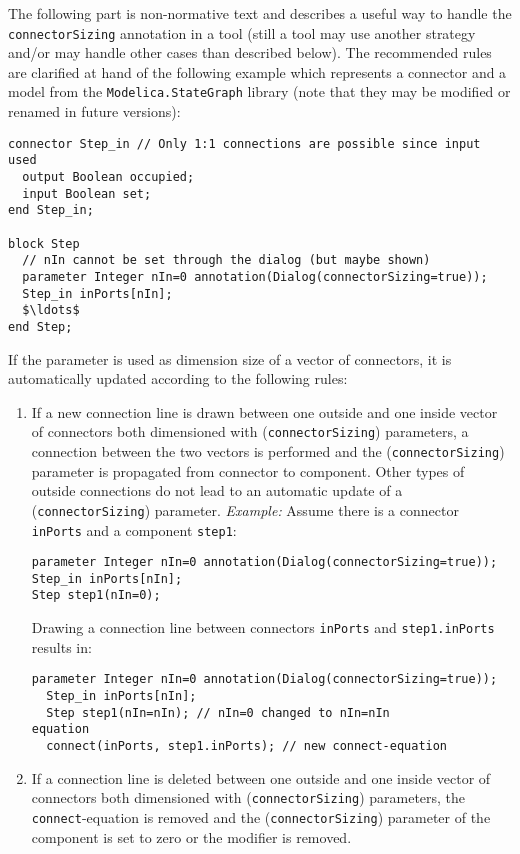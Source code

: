 \begin{nonnormative}
The following part is non-normative text and describes a useful
way to handle the \lstinline!connectorSizing! annotation in a tool (still a tool may
use another strategy and/or may handle other cases than described
below).
The recommended rules are clarified at hand of the following
example which represents a connector and a model from the
\lstinline!Modelica.StateGraph! library (note that they may be modified or renamed in future versions):
\begin{lstlisting}[language=modelica]
connector Step_in // Only 1:1 connections are possible since input used
  output Boolean occupied;
  input Boolean set;
end Step_in;

block Step
  // nIn cannot be set through the dialog (but maybe shown)
  parameter Integer nIn=0 annotation(Dialog(connectorSizing=true));
  Step_in inPorts[nIn];
  $\ldots$
end Step;
\end{lstlisting}
If the parameter is used as dimension size of a vector of
connectors, it is automatically updated according to the following
rules:
\begin{enumerate}
\item \label{connectorSizing:addVector}
  If a new connection line is drawn between one outside and one
  inside vector of connectors both dimensioned with (\lstinline!connectorSizing!)
  parameters, a connection between the two vectors is performed and the
  (\lstinline!connectorSizing!) parameter is propagated from connector to component.
  Other types of outside connections do not lead to an automatic update
  of a (\lstinline!connectorSizing!) parameter. \emph{Example:} Assume there is a
  connector \lstinline!inPorts! and a component \lstinline!step1!:
\begin{lstlisting}[language=modelica]
parameter Integer nIn=0 annotation(Dialog(connectorSizing=true));
Step_in inPorts[nIn];
Step step1(nIn=0);
\end{lstlisting}
  Drawing a connection line between connectors \lstinline!inPorts! and
  \lstinline!step1.inPorts! results in:
\begin{lstlisting}[language=modelica]
  parameter Integer nIn=0 annotation(Dialog(connectorSizing=true));
  Step_in inPorts[nIn];
  Step step1(nIn=nIn); // nIn=0 changed to nIn=nIn
equation
  connect(inPorts, step1.inPorts); // new connect-equation
\end{lstlisting}
\item\label{connectorSizing:deleteVector}
  If a connection line is deleted between one outside and one inside vector of connectors both dimensioned with (\lstinline!connectorSizing!) parameters, the \lstinline!connect!-equation is removed and the (\lstinline!connectorSizing!) parameter of the component is set to zero or the modifier is removed.

\end{enumerate}
\end{nonnormative}
